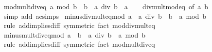 \begin{isabellebody}
\isanewline
%
\endisadelimproof
\isanewline
{}\isamarkupfalse%
\ mod{\isacharunderscore}{\kern0pt}mult{\isacharunderscore}{\kern0pt}div{\isacharunderscore}{\kern0pt}eq{\isacharcolon}{\kern0pt}\ {\isachardoublequoteopen}a\ mod\ b\ {\isacharplus}{\kern0pt}\ b\ {\isacharasterisk}{\kern0pt}\ {\isacharparenleft}{\kern0pt}a\ div\ b{\isacharparenright}{\kern0pt}\ {\isacharequal}{\kern0pt}\ a{\isachardoublequoteclose}\isanewline
%
\isadelimproof
\ \ %
\endisadelimproof
%
\isatagproof
{}\isamarkupfalse%
\ div{\isacharunderscore}{\kern0pt}mult{\isacharunderscore}{\kern0pt}mod{\isacharunderscore}{\kern0pt}eq\ {\isacharbrackleft}{\kern0pt}of\ a\ b{\isacharbrackright}{\kern0pt}\ \isamarkupfalse%
\ {\isacharparenleft}{\kern0pt}simp\ add{\isacharcolon}{\kern0pt}\ ac{\isacharunderscore}{\kern0pt}simps{\isacharparenright}{\kern0pt}%
\endisatagproof
{\isafoldproof}%
%
\isadelimproof
\isanewline
%
\endisadelimproof
\isanewline
{}\isamarkupfalse%
\ minus{\isacharunderscore}{\kern0pt}div{\isacharunderscore}{\kern0pt}mult{\isacharunderscore}{\kern0pt}eq{\isacharunderscore}{\kern0pt}mod{\isacharcolon}{\kern0pt}\ {\isachardoublequoteopen}a\ {\isacharminus}{\kern0pt}\ a\ div\ b\ {\isacharasterisk}{\kern0pt}\ b\ {\isacharequal}{\kern0pt}\ a\ mod\ b{\isachardoublequoteclose}\isanewline
%
\isadelimproof
\ \ %
\endisadelimproof
%
\isatagproof
{}\isamarkupfalse%
\ {\isacharparenleft}{\kern0pt}rule\ add{\isacharunderscore}{\kern0pt}implies{\isacharunderscore}{\kern0pt}diff\ {\isacharbrackleft}{\kern0pt}symmetric{\isacharbrackright}{\kern0pt}{\isacharparenright}{\kern0pt}\ {\isacharparenleft}{\kern0pt}fact\ mod{\isacharunderscore}{\kern0pt}div{\isacharunderscore}{\kern0pt}mult{\isacharunderscore}{\kern0pt}eq{\isacharparenright}{\kern0pt}%
\endisatagproof
{\isafoldproof}%
%
\isadelimproof
\isanewline
%
\endisadelimproof
\isanewline
{}\isamarkupfalse%
\ minus{\isacharunderscore}{\kern0pt}mult{\isacharunderscore}{\kern0pt}div{\isacharunderscore}{\kern0pt}eq{\isacharunderscore}{\kern0pt}mod{\isacharcolon}{\kern0pt}\ {\isachardoublequoteopen}a\ {\isacharminus}{\kern0pt}\ b\ {\isacharasterisk}{\kern0pt}\ {\isacharparenleft}{\kern0pt}a\ div\ b{\isacharparenright}{\kern0pt}\ {\isacharequal}{\kern0pt}\ a\ mod\ b{\isachardoublequoteclose}\isanewline
%
\isadelimproof
\ \ %
\endisadelimproof
%
\isatagproof
{}\isamarkupfalse%
\ {\isacharparenleft}{\kern0pt}rule\ add{\isacharunderscore}{\kern0pt}implies{\isacharunderscore}{\kern0pt}diff\ {\isacharbrackleft}{\kern0pt}symmetric{\isacharbrackright}{\kern0pt}{\isacharparenright}{\kern0pt}\ {\isacharparenleft}{\kern0pt}fact\ mod{\isacharunderscore}{\kern0pt}mult{\isacharunderscore}{\kern0pt}div{\isacharunderscore}{\kern0pt}eq{\isacharparenright}{\kern0pt}%

\end{isabellebody}
